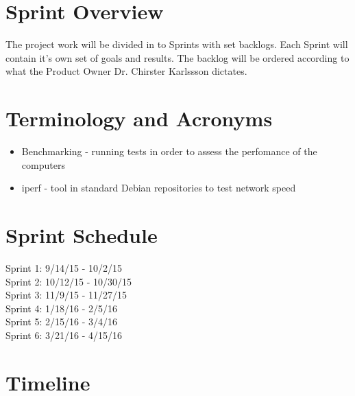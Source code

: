 \section{Sprint  Overview}


The project work will be divided in to Sprints with set backlogs. Each Sprint will contain it's own set of goals and results. The backlog will be ordered according to what the Product Owner Dr. Chirster Karlssson dictates. 

\section{Terminology and Acronyms}
\begin{itemize}
	\item Benchmarking - running tests in order to assess the perfomance of the computers
	\item iperf - tool in standard Debian repositories to test network speed
\end{itemize}

\section{Sprint Schedule}

Sprint 1: 9/14/15 - 10/2/15 \\
Sprint 2: 10/12/15 - 10/30/15 \\
Sprint 3: 11/9/15 - 11/27/15 \\
Sprint 4: 1/18/16 - 2/5/16 \\
Sprint 5: 2/15/16 - 3/4/16 \\
Sprint 6: 3/21/16 - 4/15/16 \\

\section{Timeline}

